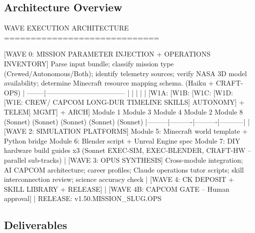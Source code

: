 \documentclass[11pt,letterpaper]{article}
\begin{document}
\subsection{Architecture Overview}

\begin{asciibox}
WAVE EXECUTION ARCHITECTURE
=============================

  [WAVE 0: MISSION PARAMETER INJECTION + OPERATIONS INVENTORY]
  Parse input bundle; classify mission type (Crewed/Autonomous/Both);
  identify telemetry sources; verify NASA 3D model availability;
  determine Minecraft resource mapping schema.
  (Haiku + CRAFT-OPS)
           |
   --------|-----------------------------------
  |         |          |          |           |
[W1A:      [W1B:      [W1C:      [W1D:      [W1E:
 CREW/      CAPCOM     LONG-DUR   TIMELINE   SKILLS]
 AUTONOMY]  + TELEM]   MGMT]      + ARCH]
 Module 1   Module 3   Module 4   Module 2   Module 8
 (Sonnet)   (Sonnet)   (Sonnet)   (Sonnet)   (Sonnet)
  |---------|----------|----------|-----------|
           |
  [WAVE 2: SIMULATION PLATFORMS]
  Module 5: Minecraft world template + Python bridge
  Module 6: Blender script + Unreal Engine spec
  Module 7: DIY hardware build guides x3
  (Sonnet EXEC-SIM, EXEC-BLENDER, CRAFT-HW -- parallel sub-tracks)
           |
  [WAVE 3: OPUS SYNTHESIS]
  Cross-module integration; AI CAPCOM architecture;
  career profiles; Claude operations tutor scripts;
  skill interconnection review; science accuracy check
           |
  [WAVE 4: CK DEPOSIT + SKILL LIBRARY + RELEASE]
           |
  [WAVE 4B: CAPCOM GATE -- Human approval]
           |
  RELEASE: v1.50.{MISSION\_SLUG}.OPS
\end{asciibox}

\subsection{Deliverables}
\end{document}

